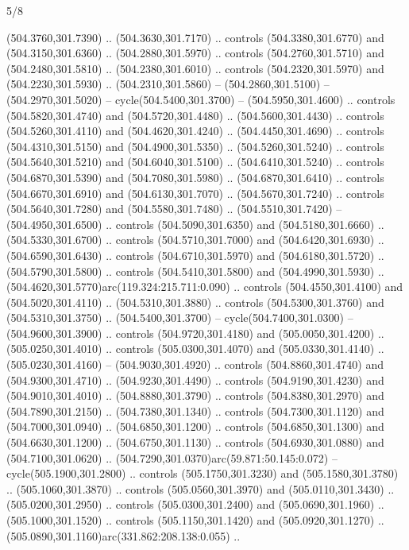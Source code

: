 \begin{flagdescription}{5/8}
\begin{scope}[xshift=0.5\flaglength,yshift=0.5\flagwidth,scale=\flagwidth/475.63]
\begin{scope}[y=0.8pt, x=0.8pt, yscale=-1, xscale=1,shift={(-450,-300)}]
\begin{scope}[cm={{1.0,0.0,0.0,1.0,(-0.0002,0.12556)}},cm={{1.0,0.0,0.0,1.0,(0.00179,0.0)}}]
\begin{scope}[cm={{1.11592,0.0,0.0,1.11592,(-106.89933,-41.77764)}}]
\begin{scope}[draw=black,fill=cfff]
\begin{scope}[fill=black]
  (504.3760,301.7390) .. (504.3630,301.7170) .. controls (504.3380,301.6770) and
  (504.3150,301.6360) .. (504.2880,301.5970) .. controls (504.2760,301.5710) and
  (504.2480,301.5810) .. (504.2380,301.6010) .. controls (504.2320,301.5970) and
  (504.2230,301.5930) .. (504.2310,301.5860) -- (504.2860,301.5100) --
  (504.2970,301.5020) -- cycle(504.5400,301.3700) -- (504.5950,301.4600) ..
  controls (504.5820,301.4740) and (504.5720,301.4480) .. (504.5600,301.4430) ..
  controls (504.5260,301.4110) and (504.4620,301.4240) .. (504.4450,301.4690) ..
  controls (504.4310,301.5150) and (504.4900,301.5350) .. (504.5260,301.5240) ..
  controls (504.5640,301.5210) and (504.6040,301.5100) .. (504.6410,301.5240) ..
  controls (504.6870,301.5390) and (504.7080,301.5980) .. (504.6870,301.6410) ..
  controls (504.6670,301.6910) and (504.6130,301.7070) .. (504.5670,301.7240) ..
  controls (504.5640,301.7280) and (504.5580,301.7480) .. (504.5510,301.7420) --
  (504.4950,301.6500) .. controls (504.5090,301.6350) and (504.5180,301.6660) ..
  (504.5330,301.6700) .. controls (504.5710,301.7000) and (504.6420,301.6930) ..
  (504.6590,301.6430) .. controls (504.6710,301.5970) and (504.6180,301.5720) ..
  (504.5790,301.5800) .. controls (504.5410,301.5800) and (504.4990,301.5930) ..
  (504.4620,301.5770)arc(119.324:215.711:0.090) .. controls (504.4550,301.4100)
  and (504.5020,301.4110) .. (504.5310,301.3880) .. controls (504.5300,301.3760)
  and (504.5310,301.3750) .. (504.5400,301.3700) -- cycle(504.7400,301.0300) --
  (504.9600,301.3900) .. controls (504.9720,301.4180) and (505.0050,301.4200) ..
  (505.0250,301.4010) .. controls (505.0300,301.4070) and (505.0330,301.4140) ..
  (505.0230,301.4160) -- (504.9030,301.4920) .. controls (504.8860,301.4740) and
  (504.9300,301.4710) .. (504.9230,301.4490) .. controls (504.9190,301.4230) and
  (504.9010,301.4010) .. (504.8880,301.3790) .. controls (504.8380,301.2970) and
  (504.7890,301.2150) .. (504.7380,301.1340) .. controls (504.7300,301.1120) and
  (504.7000,301.0940) .. (504.6850,301.1200) .. controls (504.6850,301.1300) and
  (504.6630,301.1200) .. (504.6750,301.1130) .. controls (504.6930,301.0880) and
  (504.7100,301.0620) .. (504.7290,301.0370)arc(59.871:50.145:0.072) --
  cycle(505.1900,301.2800) .. controls (505.1750,301.3230) and
  (505.1580,301.3780) .. (505.1060,301.3870) .. controls (505.0560,301.3970) and
  (505.0110,301.3430) .. (505.0200,301.2950) .. controls (505.0300,301.2400) and
  (505.0690,301.1960) .. (505.1000,301.1520) .. controls (505.1150,301.1420) and
  (505.0920,301.1270) .. (505.0890,301.1160)arc(331.862:208.138:0.055) ..

\end{scope}
\end{scope}
\end{scope}
\end{scope}
\end{scope}
\end{scope}
\end{flagdescription}
